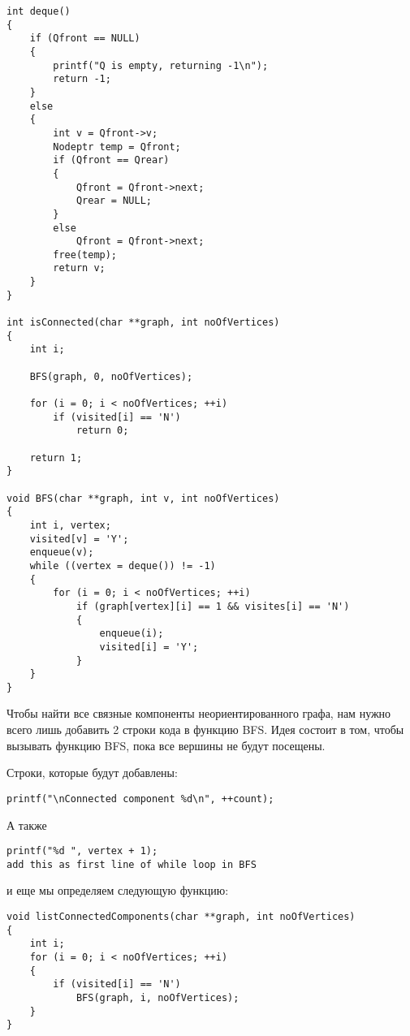 \begin{tcolorbox}
\begin{verbatim}
int deque()
{
    if (Qfront == NULL)
    {
        printf("Q is empty, returning -1\n");
        return -1;
    }
    else
    {
        int v = Qfront->v;
        Nodeptr temp = Qfront;
        if (Qfront == Qrear)
        {
            Qfront = Qfront->next;
            Qrear = NULL;
        }
        else
            Qfront = Qfront->next;
        free(temp);
        return v;
    }
}

int isConnected(char **graph, int noOfVertices)
{
    int i;
    
    BFS(graph, 0, noOfVertices);
    
    for (i = 0; i < noOfVertices; ++i)
        if (visited[i] == 'N')
            return 0;
    
    return 1;
}

void BFS(char **graph, int v, int noOfVertices)
{
    int i, vertex;
    visited[v] = 'Y';
    enqueue(v);
    while ((vertex = deque()) != -1)
    {
        for (i = 0; i < noOfVertices; ++i)
            if (graph[vertex][i] == 1 && visites[i] == 'N')
            {
                enqueue(i);
                visited[i] = 'Y';
            }
    }
}
\end{verbatim}
\end{tcolorbox}

Чтобы найти все связные компоненты неориентированного графа, нам нужно всего лишь добавить 2 строки кода в функцию BFS. Идея состоит в том, чтобы вызывать функцию BFS, пока все вершины не будут посещены.

\vspace{\baselineskip}

Строки, которые будут добавлены:

\begin{tcolorbox}
\begin{verbatim}
printf("\nConnected component %d\n", ++count);
\end{verbatim}
\end{tcolorbox}

А также

\begin{tcolorbox}
\begin{verbatim}
printf("%d ", vertex + 1);
add this as first line of while loop in BFS
\end{verbatim}
\end{tcolorbox}

и еще мы определяем следующую функцию:

\begin{tcolorbox}
\begin{verbatim}
void listConnectedComponents(char **graph, int noOfVertices)
{
    int i;
    for (i = 0; i < noOfVertices; ++i)
    {
        if (visited[i] == 'N')
            BFS(graph, i, noOfVertices);
    }
}
\end{verbatim}
\end{tcolorbox}

